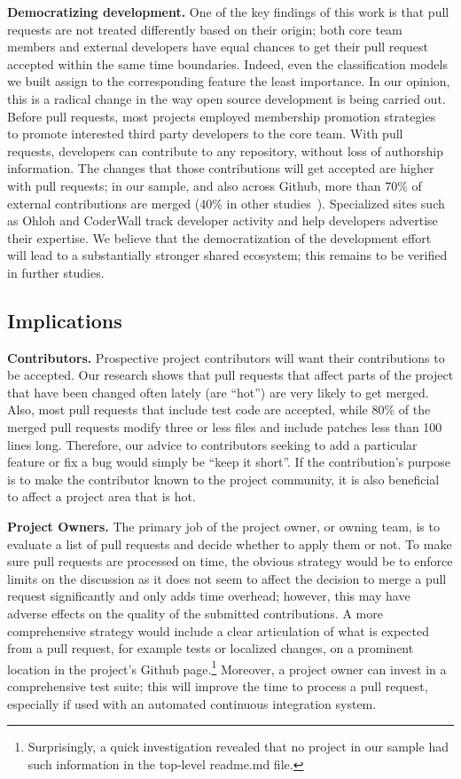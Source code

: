 \documentclass{acm_proc_article-sp}
\begin{document}
\textbf{Democratizing development.} One of the key findings of this work is
that pull requests are not treated differently based on their origin; both core
team members and external developers have equal chances to get their pull
request accepted within the same time boundaries. Indeed, even the
classification models we built assign to the corresponding feature the least
importance. In our opinion, this is a radical change in the way open source
development is being carried out. Before pull requests, most projects employed
membership promotion strategies~\cite{Jense07} to promote interested third party
developers to the core team. With pull requests, developers can contribute to
any repository, without loss of authorship information. The changes that those
contributions will get accepted are higher with pull requests; in our sample,
and also across Github, more than 70\% of external contributions are merged
(40\% in other studies~\cite{Rigby06, Weiss08}).  Specialized sites such as
Ohloh and CoderWall track developer activity and help developers advertise their
expertise. We believe that the democratization of the development effort will
lead to a substantially stronger shared ecosystem; this remains to be
verified in further studies.

\subsection{Implications}

\textbf{Contributors.}
Prospective project contributors will want their
contributions to be accepted. Our research shows that pull requests that affect parts
of the project that  have been changed often lately (are ``hot'') are very
likely to get merged. Also, most pull requests that include test code are
accepted, while 80\% of the merged pull requests modify three or less files and include
patches less than 100 lines long. Therefore, our advice to contributors seeking
to add a particular feature or fix a bug would simply be ``keep it short''. If the contribution's purpose is to make the contributor known
to the project community, it is also beneficial to affect a project area that is
hot.

\textbf{Project Owners.} The primary job of the project owner, or owning team,
is to evaluate a list of pull requests and decide whether to apply them or not.
To make sure pull requests are processed on time, the obvious strategy would be
to enforce limits on the discussion as it does not seem to affect the decision
to merge a pull request significantly and only adds time overhead; however, this
may have adverse effects on the quality of the submitted contributions. A more
comprehensive strategy would include a clear articulation of what is expected
from a pull request, for example tests or localized changes, on a prominent
location in the project's Github page.\footnote{Surprisingly, a quick
investigation revealed that no project in our sample had such information in
the top-level {\sc readme}.md file.} Moreover, a project owner can invest in a
comprehensive test suite; this will improve the time to process a pull request,
especially if used with an automated continuous integration system.
\end{document}
